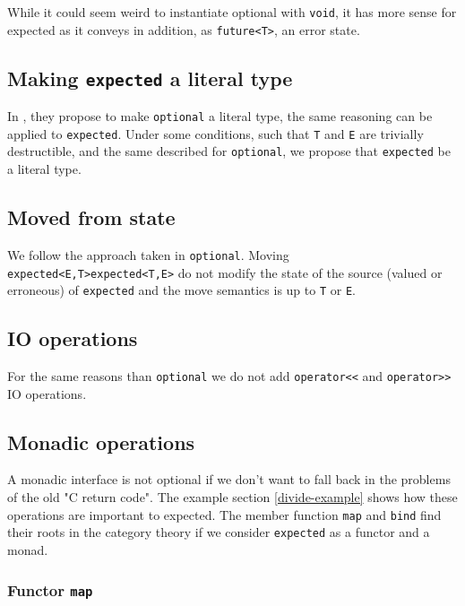 \documentclass[a4paper,10pt]{article}
\newcommand{\cpp}[1]{\lstinline{#1}}
\newcommand{\suppress}[1]{\colorbox{suppress_color}{#1}}
\newcommand{\update}[1]{\colorbox{update_color}{#1}}
\begin{document}
While it could seem weird to instantiate optional with \cpp{void}, it has more sense for expected as it conveys in addition, as \cpp{future<T>}, an error state.

\subsection{Making \cpp{expected} a literal type}

In \cite{OptionalRev4}, they propose to make \cpp{optional} a literal type, the same reasoning can be applied to \cpp{expected}. Under some conditions, such that \cpp{T} and \cpp{E} are trivially destructible, and the same described for \cpp{optional}, we propose that \cpp{expected} be a literal type.

\subsection{Moved from state}

We follow the approach taken in \cpp{optional}\cite{OptionalRev4}. Moving \suppress{\cpp{expected<E,T>}}\update{\cpp{expected<T,E>}} do not modify the state of the source (valued or erroneous) of \cpp{expected} and the move semantics is up to \cpp{T} or \cpp{E}.

\subsection{IO operations}

For the same reasons than \cpp{optional}\cite{OptionalRev4} we do not add \cpp{operator<<} and \cpp{operator>>} IO operations.

\subsection{Monadic operations}
\label{monadic-operations}

A monadic interface is not optional if we don't want to fall back in the problems of the old "C return code". The example section \ref{divide-example} shows how these operations are important to expected. The member function \cpp{map} and \cpp{bind} find their roots in the category theory if we consider \cpp{expected} as a functor and a monad.

\subsubsection{Functor \cpp{map}}
\end{document}
